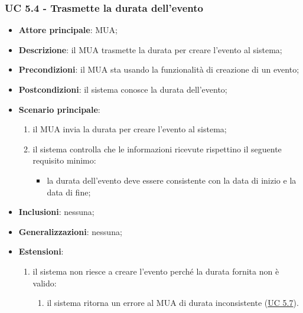     \subsubsection{UC 5.4 - Trasmette la durata dell'evento} \label{sec:UC5.4}
    \begin{itemize}
        \item \textbf{Attore principale}: MUA;
        \item \textbf{Descrizione}: il MUA trasmette la durata per creare l'evento al sistema;
        \item \textbf{Precondizioni}: il MUA sta usando la funzionalità di creazione di un evento;
        \item \textbf{Postcondizioni}: il sistema conosce la durata dell'evento;
        \item \textbf{Scenario principale}:
            \begin{enumerate}
                \item il MUA invia la durata per creare l'evento al sistema;
                \item il sistema controlla che le informazioni ricevute rispettino il seguente requisito minimo:
                    \begin{itemize}
                        \item la durata dell'evento deve essere consistente con la data di inizio e la data di fine;
                    \end{itemize}
            \end{enumerate}
        \item \textbf{Inclusioni}: nessuna;
        \item \textbf{Generalizzazioni}: nessuna;
        \item \textbf{Estensioni}:
            \begin{enumerate}[label=\alph*.]
                \item il sistema non riesce a creare l'evento perché la durata fornita non è valido:
                \begin{enumerate}[label=\arabic*.]
                    \item il sistema ritorna un errore al MUA di durata inconsistente (\hyperref[sec:UC5.7]{UC 5.7}).
                \end{enumerate}
            \end{enumerate}
    \end{itemize}


